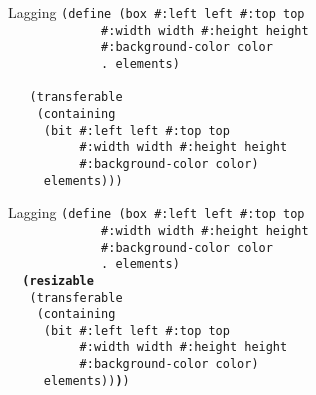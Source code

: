 \begin{frame}{Lagging}
  \texttt{(define (box \#:left left \#:top top\\
    \ \ \ \ \ \ \ \ \ \ \ \ \ \#:width width \#:height height\\
    \ \ \ \ \ \ \ \ \ \ \ \ \ \#:background-color color\\
    \ \ \ \ \ \ \ \ \ \ \ \ \ .\ elements)\\
    \ \ \\
    \ \ \ (transferable\\
    \ \ \ \ (containing\\
    \ \ \ \ \ (bit \#:left left \#:top top\\
    \ \ \ \ \ \ \ \ \ \ \#:width width \#:height height\\
    \ \ \ \ \ \ \ \ \ \ \#:background-color color)\\
    \ \ \ \ \ elements)))}
\end{frame}

\begin{frame}{Lagging}
  \texttt{(define (box \#:left left \#:top top\\
    \ \ \ \ \ \ \ \ \ \ \ \ \ \#:width width \#:height height\\
    \ \ \ \ \ \ \ \ \ \ \ \ \ \#:background-color color\\
    \ \ \ \ \ \ \ \ \ \ \ \ \ .\ elements)\\
    \ \ \textbf{(resizable}\\
    \ \ \ (transferable\\
    \ \ \ \ (containing\\
    \ \ \ \ \ (bit \#:left left \#:top top\\
    \ \ \ \ \ \ \ \ \ \ \#:width width \#:height height\\
    \ \ \ \ \ \ \ \ \ \ \#:background-color color)\\
    \ \ \ \ \ elements))\textbf{)})}
\end{frame}


